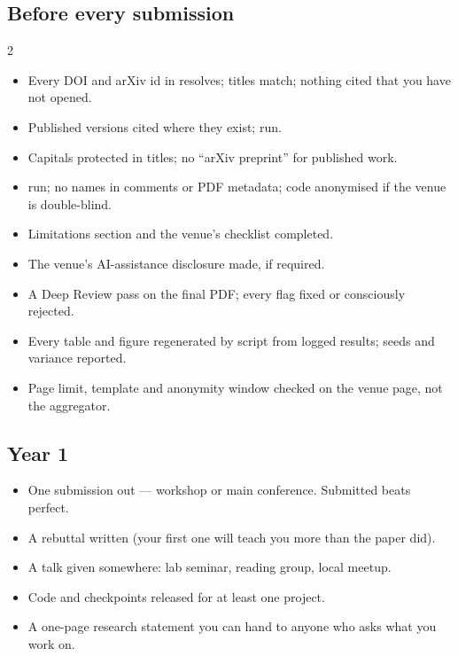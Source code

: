 \documentclass[11pt,a4paper]{article}
\begin{document}
\subsection*{Before every submission}
\begin{multicols}{2}
\begin{itemize}
  \item Every DOI and arXiv id in  resolves; titles match;
        nothing cited that you have not opened.
  \item Published versions cited where they exist;  run.
  \item Capitals protected in titles; no ``arXiv preprint'' for published
        work.
  \item {} run; no names in comments or PDF
        metadata; code anonymised if the venue is double-blind.
  \item Limitations section and the venue's checklist completed.
  \item The venue's AI-assistance disclosure made, if required.
  \item A Deep Review pass on the final PDF; every flag fixed or consciously
        rejected.
  \item Every table and figure regenerated by script from logged results;
        seeds and variance reported.
  \item Page limit, template and anonymity window checked on the venue
        page, not the aggregator.
\end{itemize}
\end{multicols}

\subsection*{Year 1}
\begin{itemize}
  \item One submission out --- workshop or main conference. Submitted beats
        perfect.
  \item A rebuttal written (your first one will teach you more than the paper
        did).
  \item A talk given somewhere: lab seminar, reading group, local meetup.
  \item Code and checkpoints released for at least one project.
  \item A one-page research statement you can hand to anyone who asks what you
        work on.
\end{itemize}
\end{document}
